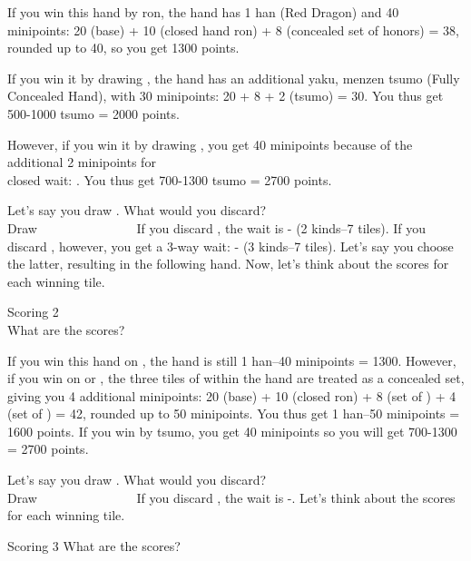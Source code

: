 \bigskip
\noindent If you win this hand by {\jap ron}, the hand has 1 {\jap han} (Red Dragon) and 40 minipoints: 20 (base) + 10 (closed hand {\jap ron}) + 8 (concealed set of honors) = 38, rounded up to 40, so you get 1300 points.

\bigskip
If you win it by drawing {\LARGE{}}, the hand has an additional {\jap yaku}, {\jap menzen tsumo} (Fully Concealed Hand), with 30 minipoints: 20 + 8 + 2 ({\jap tsumo}) = 30. You thus get 500-1000 {\jap tsumo} = 2000 points.

\bigskip
However, if you win it by drawing {\LARGE{}}, you get 40 minipoints because of the additional 2 minipoints for \\closed wait: {\LARGE{}}. You thus get 700-1300 {\jap tsumo} = 2700 points.

\bigskip

Let's say you draw {\LARGE{}}. What would you discard?
\bp
{}\zhong\zhong\zhong~\\
\hfill\footnotesize{Draw~~~~~~~~~~~~~~~}
\ep
If you discard {\LARGE{}}, the wait is {\LARGE{}-} (2 kinds--7 tiles). If you discard {\LARGE{}}, however, you get a 3-way wait: {\LARGE{}- } (3 kinds--7 tiles). Let's say you choose the latter, resulting in the following hand. Now, let's think about the scores for each winning tile.

\begin{itembox}[r]{Scoring 2}
\bp
{}\zhong\zhong\zhong\\
\ep
\vspace{-10pt} What are the scores?
\end{itembox}

\bigskip
\noindent If you win this hand on {\LARGE{}}, the hand is still 1 {\jap han}--40 minipoints = 1300. However, if you win on {\LARGE{}} or {\LARGE{}}, the three tiles of {\LARGE{}} within the hand are treated as a concealed set, giving you 4 additional minipoints: 20 (base) + 10 (closed {\jap ron}) + 8 (set of \zhong) + 4 (set of ) = 42, rounded up to 50 minipoints. You thus get 1 {\jap han}--50 minipoints = 1600 points. If you win by {\jap tsumo}, you get 40 minipoints so you will get 700-1300 = 2700 points.

\bigskip

Let's say you draw {\LARGE{}}. What would you discard?
\bp
{}\zhong\zhong\zhong~\\
\hfill\footnotesize{Draw~~~~~~~~~~~~~~~}
\ep
If you discard {\LARGE{}}, the wait is {\LARGE{}-}. Let's think about the scores for each winning tile.
\begin{itembox}[r]{Scoring 3}
\bp
{}\zhong\zhong\zhong
\ep
\vspace{-10pt} What are the scores?
\end{itembox}

